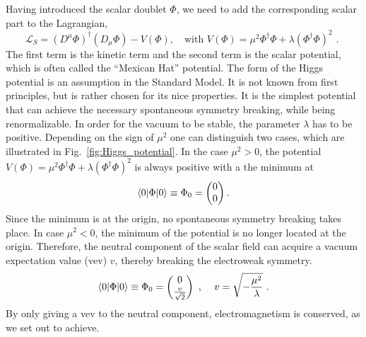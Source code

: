Having introduced the scalar doublet $\Phi$, we need to add the corresponding scalar part to the
Lagrangian,
\begin{equation}
  \mathcal{L}_{S} = (D^\mu \Phi)^\dagger(D_\mu \Phi) - V(\Phi), \quad \textrm{with } V(\Phi) = \mu^2
\Phi^\dagger \Phi + \lambda (\Phi^\dagger \Phi)^2 \textrm{ . } 
  \label{eq:scalarlagr}
\end{equation}
The first term is the kinetic term and the second term is the scalar potential, which is often
called the ``Mexican Hat'' potential. The form of the Higgs potential is an assumption in the
Standard Model. It is not known from first principles, but is rather chosen for its nice
properties. It is the simplest potential that can achieve the necessary spontaneous symmetry
breaking, while being renormalizable.  
In order for the vacuum to be stable, the parameter $\lambda$ has to be positive. Depending on the
sign of $\mu^2$ one can distinguish two cases, which are illustrated in
Fig.~\ref{fig:Higgs_potential}. 
In the case $\mu^2 > 0$, the potential $V(\Phi) = \mu^2 \Phi^\dagger \Phi + \lambda (\Phi^\dagger
\Phi)^2$ is always positive with a the minimum  at 
\begin{equation}
\braket{0|\Phi|0} \equiv \Phi_0 = \begin{pmatrix}0\\0\end{pmatrix}. 
\end{equation}
Since the minimum is at the origin, no spontaneous symmetry breaking takes place. 
In case $\mu^2 < 0$, the minimum of the potential is no longer located at the origin. Therefore, the
neutral component of the scalar field can acquire a vacuum expectation value (vev) $v$, thereby
breaking the electroweak symmetry.
\begin{equation}
  \braket{0|\Phi|0} \equiv \Phi_0 = \begin{pmatrix} 0 \\ \frac{v}{\sqrt{2}} \end{pmatrix} \textrm{ ,
} \quad v = \sqrt{- \frac{\mu^2}{\lambda}} \textrm{ .}
\end{equation}
By only giving a vev to the neutral component, electromagnetism is conserved, as we set out
to achieve. 

